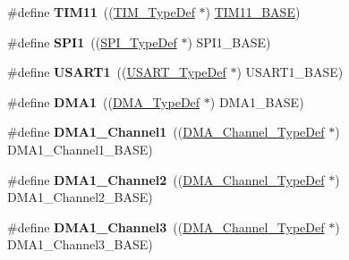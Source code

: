 \begin{DoxyCompactItemize}
\item 
\hypertarget{group___peripheral__declaration_gacfd11ef966c7165f57e2cebe0abc71ad}{\#define {\bfseries T\-I\-M11}~((\hyperlink{struct_t_i_m___type_def}{T\-I\-M\-\_\-\-Type\-Def} $\ast$) \hyperlink{group___peripheral__memory__map_ga3a4a06bb84c703084f0509e105ffaf1d}{T\-I\-M11\-\_\-\-B\-A\-S\-E})}\label{group___peripheral__declaration_gacfd11ef966c7165f57e2cebe0abc71ad}

\item 
\hypertarget{group___peripheral__declaration_gad483be344a28ac800be8f03654a9612f}{\#define {\bfseries S\-P\-I1}~((\hyperlink{struct_s_p_i___type_def}{S\-P\-I\-\_\-\-Type\-Def} $\ast$) S\-P\-I1\-\_\-\-B\-A\-S\-E)}\label{group___peripheral__declaration_gad483be344a28ac800be8f03654a9612f}

\item 
\hypertarget{group___peripheral__declaration_ga92871691058ff7ccffd7635930cb08da}{\#define {\bfseries U\-S\-A\-R\-T1}~((\hyperlink{struct_u_s_a_r_t___type_def}{U\-S\-A\-R\-T\-\_\-\-Type\-Def} $\ast$) U\-S\-A\-R\-T1\-\_\-\-B\-A\-S\-E)}\label{group___peripheral__declaration_ga92871691058ff7ccffd7635930cb08da}

\item 
\hypertarget{group___peripheral__declaration_gacc16d2a5937f7585320a98f7f6b578f9}{\#define {\bfseries D\-M\-A1}~((\hyperlink{struct_d_m_a___type_def}{D\-M\-A\-\_\-\-Type\-Def} $\ast$) D\-M\-A1\-\_\-\-B\-A\-S\-E)}\label{group___peripheral__declaration_gacc16d2a5937f7585320a98f7f6b578f9}

\item 
\hypertarget{group___peripheral__declaration_gac83c5be824be1c02716e2522e80ddf7a}{\#define {\bfseries D\-M\-A1\-\_\-\-Channel1}~((\hyperlink{struct_d_m_a___channel___type_def}{D\-M\-A\-\_\-\-Channel\-\_\-\-Type\-Def} $\ast$) D\-M\-A1\-\_\-\-Channel1\-\_\-\-B\-A\-S\-E)}\label{group___peripheral__declaration_gac83c5be824be1c02716e2522e80ddf7a}

\item 
\hypertarget{group___peripheral__declaration_ga23d7631dd10c645e06971b2543ba2949}{\#define {\bfseries D\-M\-A1\-\_\-\-Channel2}~((\hyperlink{struct_d_m_a___channel___type_def}{D\-M\-A\-\_\-\-Channel\-\_\-\-Type\-Def} $\ast$) D\-M\-A1\-\_\-\-Channel2\-\_\-\-B\-A\-S\-E)}\label{group___peripheral__declaration_ga23d7631dd10c645e06971b2543ba2949}

\item 
\hypertarget{group___peripheral__declaration_gacf7b6093a37b306d7f1f50b2f200f0d0}{\#define {\bfseries D\-M\-A1\-\_\-\-Channel3}~((\hyperlink{struct_d_m_a___channel___type_def}{D\-M\-A\-\_\-\-Channel\-\_\-\-Type\-Def} $\ast$) D\-M\-A1\-\_\-\-Channel3\-\_\-\-B\-A\-S\-E)}\label{group___peripheral__declaration_gacf7b6093a37b306d7f1f50b2f200f0d0}


\end{DoxyCompactItemize}
